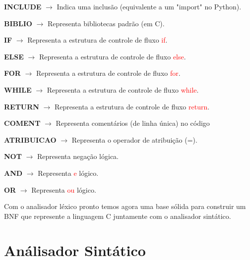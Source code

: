 \documentclass[12pt,a4paper]{report}
\begin{document}
    \hspace{3cm}
    \textbf{INCLUDE} $\rightarrow$ Indica uma inclusão (equivalente a um "import" no Python).

    \hspace{3cm}
    \textbf{BIBLIO} $\rightarrow$ Representa bibliotecas padrão (em C).
    
    \hspace{3cm}
    \textbf{IF} $\rightarrow$ Representa a estrutura de controle de fluxo \textcolor{red}{if}.

    \hspace{3cm}
    \textbf{ELSE} $\rightarrow$ Representa a estrutura de controle de fluxo \textcolor{red}{else}.

    \hspace{3cm}
    \textbf{FOR} $\rightarrow$ Representa a estrutura de controle de fluxo \textcolor{red}{for}.

    \hspace{3cm}
    \textbf{WHILE} $\rightarrow$ Representa a estrutura de controle de fluxo \textcolor{red}{while}.

    \hspace{3cm}
    \textbf{RETURN} $\rightarrow$ Representa a estrutura de controle de fluxo \textcolor{red}{return}. 

    \hspace{3cm}
    \textbf{COMENT} $\rightarrow$ Representa comentários (de linha única) no código

    \hspace{3cm}
    \textbf{ATRIBUICAO} $\rightarrow$ Representa o operador de atribuição (=).
    
    \hspace{3cm}
    \textbf{NOT} $\rightarrow$ Representa negação lógica.

    \hspace{3cm}
    \textbf{AND} $\rightarrow$ Representa \textcolor{red}{e} lógico.

    \hspace{3cm}
    \textbf{OR} $\rightarrow$ Representa \textcolor{red}{ou} lógico.

    Com o analisador léxico pronto temos agora uma base sólida para construir um BNF que represente a linguagem C juntamente com o analisador sintático.
\chapter{An\'{a}lisador Sint\'{a}tico}
\end{document}
